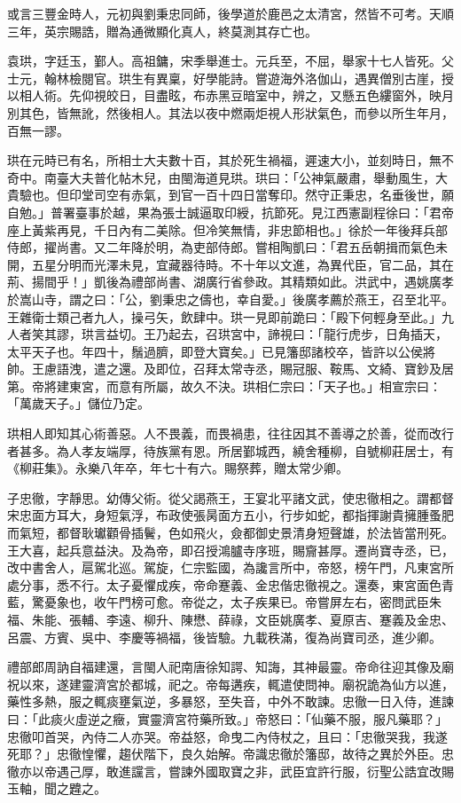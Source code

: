 \begin{pinyinscope}
或言三豐金時人，元初與劉秉忠同師，後學道於鹿邑之太清宮，然皆不可考。天順三年，英宗賜誥，贈為通微顯化真人，終莫測其存亡也。

袁珙，字廷玉，鄞人。高祖鏞，宋季舉進士。元兵至，不屈，舉家十七人皆死。父士元，翰林檢閱官。珙生有異稟，好學能詩。嘗遊海外洛伽山，遇異僧別古崖，授以相人術。先仰視皎日，目盡眩，布赤黑豆暗室中，辨之，又懸五色縷窗外，映月別其色，皆無訛，然後相人。其法以夜中燃兩炬視人形狀氣色，而參以所生年月，百無一謬。

珙在元時已有名，所相士大夫數十百，其於死生禍福，遲速大小，並刻時日，無不奇中。南臺大夫普化帖木兒，由閩海道見珙。珙曰：「公神氣嚴肅，舉動風生，大貴驗也。但印堂司空有赤氣，到官一百十四日當奪印。然守正秉忠，名垂後世，願自勉。」普署臺事於越，果為張士誠逼取印綬，抗節死。見江西憲副程徐曰：「君帝座上黃紫再見，千日內有二美除。但冷笑無情，非忠節相也。」徐於一年後拜兵部侍郎，擢尚書。又二年降於明，為吏部侍郎。嘗相陶凱曰：「君五岳朝揖而氣色未開，五星分明而光澤未見，宜藏器待時。不十年以文進，為異代臣，官二品，其在荊、揚間乎！」凱後為禮部尚書、湖廣行省參政。其精類如此。洪武中，遇姚廣孝於嵩山寺，謂之曰：「公，劉秉忠之儔也，幸自愛。」後廣孝薦於燕王，召至北平。王雜衛士類己者九人，操弓矢，飲肆中。珙一見即前跪曰：「殿下何輕身至此。」九人者笑其謬，珙言益切。王乃起去，召珙宮中，諦視曰：「龍行虎步，日角插天，太平天子也。年四十，鬚過臍，即登大寶矣。」已見籓邸諸校卒，皆許以公侯將帥。王慮語洩，遣之還。及即位，召拜太常寺丞，賜冠服、鞍馬、文綺、寶鈔及居第。帝將建東宮，而意有所屬，故久不決。珙相仁宗曰：「天子也。」相宣宗曰：「萬歲天子。」儲位乃定。

珙相人即知其心術善惡。人不畏義，而畏禍患，往往因其不善導之於善，從而改行者甚多。為人孝友端厚，待族黨有恩。所居鄞城西，繞舍種柳，自號柳莊居士，有《柳莊集》。永樂八年卒，年七十有六。賜祭葬，贈太常少卿。

子忠徹，字靜思。幼傳父術。從父謁燕王，王宴北平諸文武，使忠徹相之。謂都督宋忠面方耳大，身短氣浮，布政使張昺面方五小，行步如蛇，都指揮謝貴擁腫蚤肥而氣短，都督耿瓛顴骨插鬢，色如飛火，僉都御史景清身短聲雄，於法皆當刑死。王大喜，起兵意益決。及為帝，即召授鴻臚寺序班，賜齎甚厚。遷尚寶寺丞，已，改中書舍人，扈駕北巡。駕旋，仁宗監國，為讒言所中，帝怒，榜午門，凡東宮所處分事，悉不行。太子憂懼成疾，帝命蹇義、金忠偕忠徹視之。還奏，東宮面色青藍，驚憂象也，收午門榜可愈。帝從之，太子疾果已。帝嘗屏左右，密問武臣朱福、朱能、張輔、李遠、柳升、陳懋、薛祿，文臣姚廣孝、夏原吉、蹇義及金忠、呂震、方賓、吳中、李慶等禍福，後皆驗。九載秩滿，復為尚寶司丞，進少卿。

禮部郎周訥自福建還，言閩人祀南唐徐知諤、知誨，其神最靈。帝命往迎其像及廟祝以來，遂建靈濟宮於都城，祀之。帝每遘疾，輒遣使問神。廟祝詭為仙方以進，藥性多熱，服之輒痰壅氣逆，多暴怒，至失音，中外不敢諫。忠徹一日入侍，進諫曰：「此痰火虛逆之癥，實靈濟宮符藥所致。」帝怒曰：「仙藥不服，服凡藥耶？」忠徹叩首哭，內侍二人亦哭。帝益怒，命曳二內侍杖之，且曰：「忠徹哭我，我遂死耶？」忠徹惶懼，趨伏階下，良久始解。帝識忠徹於籓邸，故待之異於外臣。忠徹亦以帝遇己厚，敢進讜言，嘗諫外國取寶之非，武臣宜許行服，衍聖公誥宜改賜玉軸，聞之韙之。


\end{pinyinscope}
